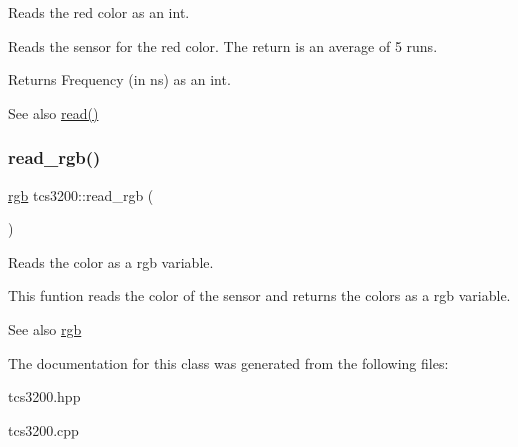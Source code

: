 Reads the red color as an int. 

Reads the sensor for the red color. The return is an average of 5 runs. \begin{DoxyReturn}{Returns}
Frequency (in ns) as an int. 
\end{DoxyReturn}
\begin{DoxySeeAlso}{See also}
\hyperlink{classtcs3200_a02b9d9553e97b38bd3aab87bc5ea84b2}{read()} 
\end{DoxySeeAlso}
\mbox{\label{classtcs3200_ad2d5daf026a53178ea90f62f7f8b0adb}} 
\subsubsection{\texorpdfstring{read\+\_\+rgb()}{read\_rgb()}}
{\footnotesize\ttfamily \hyperlink{structrgb}{rgb} tcs3200\+::read\+\_\+rgb (\begin{DoxyParamCaption}{ }\end{DoxyParamCaption})\hspace{0.3cm}{\ttfamily [inline]}}



Reads the color as a rgb variable. 

This funtion reads the color of the sensor and returns the colors as a rgb variable. \begin{DoxySeeAlso}{See also}
\hyperlink{structrgb}{rgb} 
\end{DoxySeeAlso}


The documentation for this class was generated from the following files\+:\begin{DoxyCompactItemize}
\item 
tcs3200.\+hpp\item 
tcs3200.\+cpp\end{DoxyCompactItemize}
